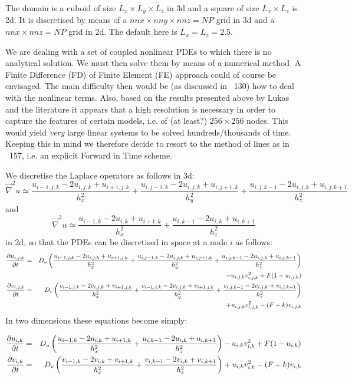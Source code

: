 The domain is a cuboid of size $L_x \times L_y \times L_z$ in 3d and 
a square of size $L_x \times L_z$ is 2d.
It is discretised by means of a $nnx \times nny \times nnz = NP$ grid
in 3d and a $nnx \times nnz = NP$ grid in 2d.
The default here is $L_x=L_z=2.5$.

We are dealing with a set of coupled nonlinear PDEs to which there is no analytical solution.
We must then solve them by means of a numerical method. 
A Finite Difference (FD) of Finite Element (FE) approach could of course be envisaged. 
The main difficulty then would be (as discussed in \stone~130) how to deal with the 
nonlinear terms. Also, based on 
the results presented above by Lukas and the literature 
it appears that a high resolution is necessary in order
to capture the features of certain models, i.e. of (at least?) $256\times 256$ nodes. 
This would yield {\it very} large linear systems to be solved hundreds/thousands of time.
Keeping this in mind we therefore decide to resort to the method of lines as in \stone~157,
i.e. an explicit Forward in Time scheme.

We discretise the Laplace operators as follows in 3d:
\[
\vec\nabla^2 u \simeq 
\frac{u_{i-1,j,k}-2u_{i,j,k}+u_{i+1,j,k}}{h_x^2} + 
\frac{u_{i,j-1,k}-2u_{i,j,k}+u_{i,j+1,k}}{h_y^2} + 
\frac{u_{i,j,k-1}-2u_{i,j,k}+u_{i,j,k+1}}{h_z^2} 
\]
and
\[
\vec\nabla^2 u \simeq 
\frac{u_{i-1,k}-2u_{i,k}+u_{i+1,k}}{h_x^2} + 
\frac{u_{i,k-1}-2u_{i,k}+u_{i,k+1}}{h_z^2} 
\]
in 2d, so that the PDEs can be discretised in space at a node $i$ as follows:
\begin{eqnarray}
\frac{\partial u_{i,j,k}}{\partial t} 
&=& D_u 
\left(
\frac{u_{i-1,j,k}-2u_{i,j,k}+u_{i+1,j,k}}{h_x^2} + 
\frac{u_{i,j-1,k}-2u_{i,j,k}+u_{i,j+1,k}}{h_y^2} + 
\frac{u_{i,j,k-1}-2u_{i,j,k}+u_{i,j,k+1}}{h_z^2} 
\right) \nonumber\\
&&- u_{i,j,k}v_{i,j,k}^2 + F(1-u_{i,j,k}) 
\nonumber\\
\frac{\partial v_{i,j,k}}{\partial t} &=& D_v 
\left(
\frac{v_{i-1,j,k}-2v_{i,j,k}+v_{i+1,j,k}}{h_x^2} + 
\frac{v_{i-1,j,k}-2v_{i,j,k}+v_{i+1,j,k}}{h_y^2} + 
\frac{v_{i,j,k-1}-2v_{i,j,k}+v_{i,j,k+1}}{h_z^2} 
\right) \nonumber\\
&&
+ u_{i,j,k}v_{i,j,k}^2 - (F+k)v_{i,j,k}
\end{eqnarray}
In two dimensions these equations become simply:

\begin{eqnarray}
\frac{\partial u_{i,k}}{\partial t} 
&=& D_u 
\left(
\frac{u_{i-1,k}-2u_{i,k}+u_{i+1,k}}{h_x^2} + 
\frac{u_{i,k-1}-2u_{i,k}+u_{i,k+1}}{h_z^2} 
\right)
- u_{i,k}v_{i,k}^2 + F(1-u_{i,k}) 
\nonumber\\
\frac{\partial v_{i,k}}{\partial t} &=& D_v 
\left(
\frac{v_{i-1,k}-2v_{i,k}+v_{i+1,k}}{h_x^2} + 
\frac{v_{i,k-1}-2v_{i,k}+v_{i,k+1}}{h_z^2} 
\right) 
+ u_{i,k}v_{i,k}^2 - (F+k)v_{i,k}
\end{eqnarray}

